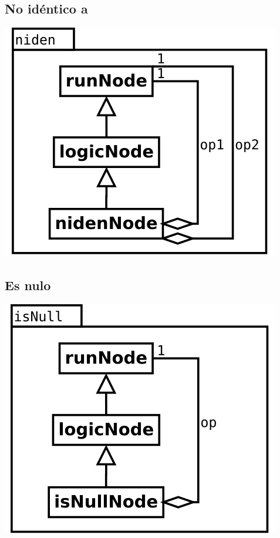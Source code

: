 \subsection {No idéntico a}
\begin{center}
\includegraphics[scale=0.4]{niden.png} \\
\end{center}

\subsection {Es nulo}
\begin{center}
\includegraphics[scale=0.4]{isNull.png} \\
\end{center}

